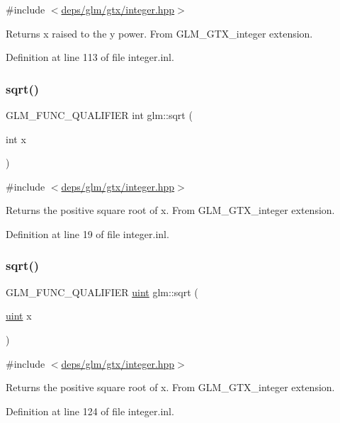 {\ttfamily \#include $<$\hyperlink{gtx_2integer_8hpp}{deps/glm/gtx/integer.\+hpp}$>$}

Returns x raised to the y power. From G\+L\+M\+\_\+\+G\+T\+X\+\_\+integer extension. 

Definition at line 113 of file integer.\+inl.

\mbox{\label{group__gtx__integer_ga78e2e68330e91d350fcfc2f4831cad12}} 
\subsubsection{\texorpdfstring{sqrt()}{sqrt()}\hspace{0.1cm}{\footnotesize\ttfamily [1/2]}}
{\footnotesize\ttfamily G\+L\+M\+\_\+\+F\+U\+N\+C\+\_\+\+Q\+U\+A\+L\+I\+F\+I\+ER int glm\+::sqrt (\begin{DoxyParamCaption}\item[{int}]{x }\end{DoxyParamCaption})}



{\ttfamily \#include $<$\hyperlink{gtx_2integer_8hpp}{deps/glm/gtx/integer.\+hpp}$>$}

Returns the positive square root of x. From G\+L\+M\+\_\+\+G\+T\+X\+\_\+integer extension. 

Definition at line 19 of file integer.\+inl.

\mbox{\label{group__gtx__integer_ga457e9efca8339bf918d319e9c55f7c8f}} 
\subsubsection{\texorpdfstring{sqrt()}{sqrt()}\hspace{0.1cm}{\footnotesize\ttfamily [2/2]}}
{\footnotesize\ttfamily G\+L\+M\+\_\+\+F\+U\+N\+C\+\_\+\+Q\+U\+A\+L\+I\+F\+I\+ER \hyperlink{group__core__precision_ga4fd29415871152bfb5abd588334147c8}{uint} glm\+::sqrt (\begin{DoxyParamCaption}\item[{\hyperlink{group__core__precision_ga4fd29415871152bfb5abd588334147c8}{uint}}]{x }\end{DoxyParamCaption})}



{\ttfamily \#include $<$\hyperlink{gtx_2integer_8hpp}{deps/glm/gtx/integer.\+hpp}$>$}

Returns the positive square root of x. From G\+L\+M\+\_\+\+G\+T\+X\+\_\+integer extension. 

Definition at line 124 of file integer.\+inl.

